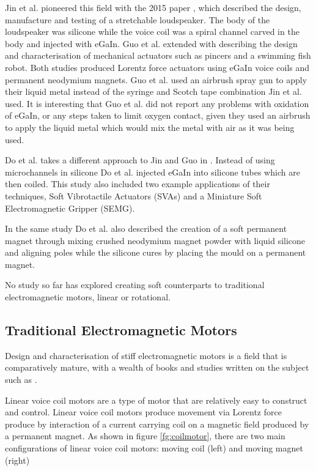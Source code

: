 \documentclass[a4paper,12pt]{article}
\begin{document}
Jin et al. pioneered this field with the 2015 paper \cite{jinStretchableLoudspeakerUsing2015}, which described the design, manufacture and testing of a stretchable loudspeaker. The body of the loudspeaker was silicone while the voice coil was a spiral channel carved in the body and injected with eGaIn. Guo et al. extended \cite{jinStretchableLoudspeakerUsing2015} with \cite{guoLiquidMetalSpiral2018} describing the design and characterisation of mechanical actuators such as pincers and a swimming fish robot. Both studies produced Lorentz force actuators using eGaIn voice coils and permanent neodymium magnets. Guo et al. used an airbrush spray gun to apply their liquid metal instead of the syringe and Scotch tape combination Jin et al. used. It is interesting that Guo et al. did not report any problems with oxidation of eGaIn, or any steps taken to limit oxygen contact, given they used an airbrush to apply the liquid metal which would mix the metal with air as it was being used.

Do et al. takes a different approach to Jin and Guo in \cite{doMiniatureSoftElectromagnetic2018}. Instead of using microchannels in silicone Do et al. injected eGaIn into silicone tubes which are then coiled. This study also included two example applications of their techniques, Soft Vibrotactile Actuators (SVAs) and a Miniature Soft Electromagnetic Gripper (SEMG).

In the same study Do et al. also described the creation of a soft permanent magnet through mixing crushed neodymium magnet powder with liquid silicone and aligning poles while the silicone cures by placing the mould on a permanent magnet.

No study so far has explored creating soft counterparts to traditional electromagnetic motors, linear or rotational.

\subsection{Traditional Electromagnetic Motors}
Design and characterisation of stiff electromagnetic motors is a field that is comparatively mature, with a wealth of books and studies written on the subject such as \cite{moritzElectromechanicalMotionSystems2013}.

Linear voice coil motors are a type of motor that are relatively easy to construct and control. Linear voice coil motors produce movement via Lorentz force produce by interaction of a current carrying coil on a magnetic field produced by a permanent magnet. As shown in figure \ref{fg:coilmotor}, there are two main configurations of linear voice coil motors: moving coil (left) and moving magnet (right)
\end{document}
